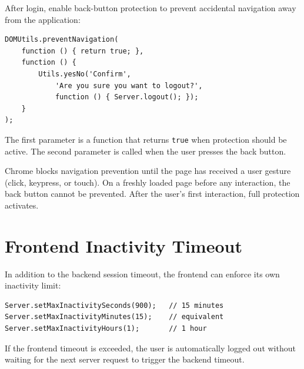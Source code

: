 After login, enable back-button protection to prevent accidental navigation away from the application:

\begin{lstlisting}[style=javascript]
DOMUtils.preventNavigation(
    function () { return true; },
    function () {
        Utils.yesNo('Confirm',
            'Are you sure you want to logout?',
            function () { Server.logout(); });
    }
);
\end{lstlisting}

\noindent
The first parameter is a function that returns \texttt{true} when protection should be active.  The second parameter is called when the user presses the back button.

\begin{notebox}
Chrome blocks navigation prevention until the page has received a user gesture (click, keypress, or touch).  On a freshly loaded page before any interaction, the back button cannot be prevented.  After the user's first interaction, full protection activates.
\end{notebox}

\section{Frontend Inactivity Timeout}
\label{sec:auth-frontend-timeout}

In addition to the backend session timeout, the frontend can enforce its own inactivity limit:

\begin{lstlisting}[style=javascript]
Server.setMaxInactivitySeconds(900);   // 15 minutes
Server.setMaxInactivityMinutes(15);    // equivalent
Server.setMaxInactivityHours(1);       // 1 hour
\end{lstlisting}

\noindent
If the frontend timeout is exceeded, the user is automatically logged out without waiting for the next server request to trigger the backend timeout.
